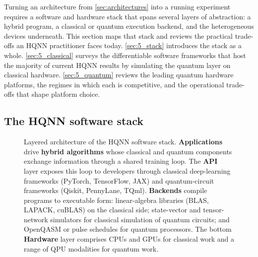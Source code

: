 \documentclass[aps,10pt,groupedaddress,prx,superscriptaddress,twocolumn,balancelastpage, tightenlines]{revtex4-2}
\theoremstyle{plain}  %
\begin{document}
Turning an architecture from \autoref{sec:architectures} into a running experiment requires a software and hardware stack that spans several layers of abstraction: a hybrid program, a classical or quantum execution backend, and the heterogeneous devices underneath. This section maps that stack and reviews the practical trade-offs an \gls{HQNN} practitioner faces today. \autoref{sec:5_stack} introduces the stack as a whole. \autoref{sec:5_classical} surveys the differentiable software frameworks that host the majority of current \gls{HQNN} results by simulating the quantum layer on classical hardware. \autoref{sec:5_quantum} reviews the leading quantum hardware platforms, the regimes in which each is competitive, and the operational trade-offs that shape platform choice.

\subsection{The HQNN software stack}
\label{sec:5_stack}

\begin{figure}[htbp!]
    \centering
    
    \caption{Layered architecture of the \gls{HQNN} software stack. \textbf{Applications} drive \textbf{hybrid algorithms} whose classical and quantum components exchange information through a shared training loop. The \textbf{API} layer exposes this loop to developers through classical deep-learning frameworks (PyTorch, TensorFlow, JAX) and quantum-circuit frameworks (Qiskit, PennyLane, TQml). \textbf{Backends} compile programs to executable form: linear-algebra libraries (BLAS, LAPACK, cuBLAS) on the classical side; state-vector and tensor-network simulators for classical simulation of quantum circuits; and OpenQASM or pulse schedules for quantum processors. The bottom \textbf{Hardware} layer comprises CPUs and GPUs for classical work and a range of \gls{QPU} modalities for quantum work.}
    \label{fig:hqnn_stack}
\end{figure}
\end{document}
